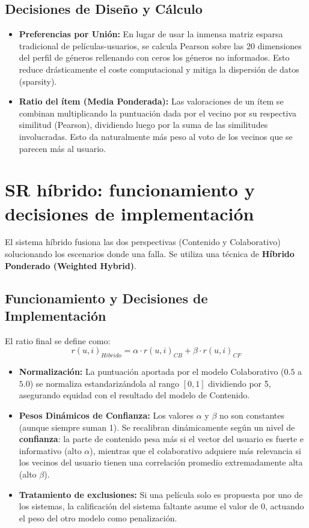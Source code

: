 \documentclass[12pt]{scrartcl}
\begin{document}
\subsection{Decisiones de Diseño y Cálculo}
\begin{itemize}
    \item \textbf{Preferencias por Unión:} En lugar de usar la inmensa matriz esparsa tradicional de películas-usuarios, se calcula Pearson sobre las 20 dimensiones del perfil de géneros rellenando con ceros los géneros no informados. Esto reduce drásticamente el coste computacional y mitiga la dispersión de datos (sparsity).
    \item \textbf{Ratio del ítem (Media Ponderada):} Las valoraciones de un ítem se combinan multiplicando la puntuación dada por el vecino por su respectiva similitud (Pearson), dividiendo luego por la suma de las similitudes involucradas. Esto da naturalmente más peso al voto de los vecinos que se parecen más al usuario.
\end{itemize}

\section{SR híbrido: funcionamiento y decisiones de implementación}
El sistema híbrido fusiona las dos perspectivas (Contenido y Colaborativo) solucionando los escenarios donde una falla. Se utiliza una técnica de \textbf{Híbrido Ponderado (Weighted Hybrid)}.

\subsection{Funcionamiento y Decisiones de Implementación}
El ratio final se define como:
\begin{equation}
    r(u,i)_{Hibrido} = \alpha \cdot r(u,i)_{CB} + \beta \cdot r(u,i)_{CF}
\end{equation}
\begin{itemize}
    \item \textbf{Normalización:} La puntuación aportada por el modelo Colaborativo ($0.5$ a $5.0$) se normaliza estandarizándola al rango $[0,1]$ dividiendo por 5, asegurando equidad con el resultado del modelo de Contenido.
    \item \textbf{Pesos Dinámicos de Confianza:} Los valores $\alpha$ y $\beta$ no son constantes (aunque siempre suman 1). Se recalibran dinámicamente según un nivel de \textbf{confianza}: la parte de contenido pesa más si el vector del usuario es fuerte e informativo (alto $\alpha$), mientras que el colaborativo adquiere más relevancia si los vecinos del usuario tienen una correlación promedio extremadamente alta (alto $\beta$).
    \item \textbf{Tratamiento de exclusiones:} Si una película solo es propuesta por uno de los sistemas, la calificación del sistema faltante asume el valor de $0$, actuando el peso del otro modelo como penalización.
\end{itemize}
\end{document}

